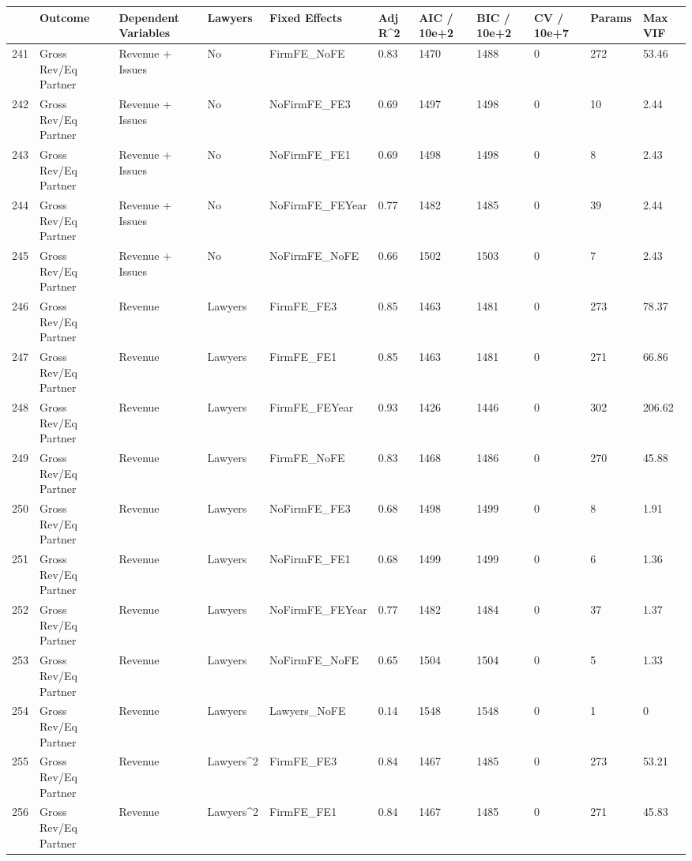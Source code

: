\documentclass{article}
\begin{document}
\begin{table}[H]
\centering
\begin{tabular}{rllllllllll}
  \hline
 & Outcome & Dependent Variables & Lawyers & Fixed Effects & Adj R^2 & AIC / 10e+2 & BIC / 10e+2 & CV / 10e+7 & Params & Max VIF \\ 
  \hline
241 & Gross Rev/Eq Partner & Revenue + Issues & No & FirmFE\_NoFE & 0.83 & 1470 & 1488 & 0 & 272 & 53.46 \\ 
  242 & Gross Rev/Eq Partner & Revenue + Issues & No & NoFirmFE\_FE3 & 0.69 & 1497 & 1498 & 0 & 10 & 2.44 \\ 
  243 & Gross Rev/Eq Partner & Revenue + Issues & No & NoFirmFE\_FE1 & 0.69 & 1498 & 1498 & 0 & 8 & 2.43 \\ 
  244 & Gross Rev/Eq Partner & Revenue + Issues & No & NoFirmFE\_FEYear & 0.77 & 1482 & 1485 & 0 & 39 & 2.44 \\ 
  245 & Gross Rev/Eq Partner & Revenue + Issues & No & NoFirmFE\_NoFE & 0.66 & 1502 & 1503 & 0 & 7 & 2.43 \\ 
  246 & Gross Rev/Eq Partner & Revenue & Lawyers & FirmFE\_FE3 & 0.85 & 1463 & 1481 & 0 & 273 & 78.37 \\ 
  247 & Gross Rev/Eq Partner & Revenue & Lawyers & FirmFE\_FE1 & 0.85 & 1463 & 1481 & 0 & 271 & 66.86 \\ 
  248 & Gross Rev/Eq Partner & Revenue & Lawyers & FirmFE\_FEYear & 0.93 & 1426 & 1446 & 0 & 302 & 206.62 \\ 
  249 & Gross Rev/Eq Partner & Revenue & Lawyers & FirmFE\_NoFE & 0.83 & 1468 & 1486 & 0 & 270 & 45.88 \\ 
  250 & Gross Rev/Eq Partner & Revenue & Lawyers & NoFirmFE\_FE3 & 0.68 & 1498 & 1499 & 0 & 8 & 1.91 \\ 
  251 & Gross Rev/Eq Partner & Revenue & Lawyers & NoFirmFE\_FE1 & 0.68 & 1499 & 1499 & 0 & 6 & 1.36 \\ 
  252 & Gross Rev/Eq Partner & Revenue & Lawyers & NoFirmFE\_FEYear & 0.77 & 1482 & 1484 & 0 & 37 & 1.37 \\ 
  253 & Gross Rev/Eq Partner & Revenue & Lawyers & NoFirmFE\_NoFE & 0.65 & 1504 & 1504 & 0 & 5 & 1.33 \\ 
  254 & Gross Rev/Eq Partner & Revenue & Lawyers & Lawyers\_NoFE & 0.14 & 1548 & 1548 & 0 & 1 & 0 \\ 
  255 & Gross Rev/Eq Partner & Revenue & Lawyers^2 & FirmFE\_FE3 & 0.84 & 1467 & 1485 & 0 & 273 & 53.21 \\ 
  256 & Gross Rev/Eq Partner & Revenue & Lawyers^2 & FirmFE\_FE1 & 0.84 & 1467 & 1485 & 0 & 271 & 45.83 \\ 

\end{tabular}
\end{table}
\end{document}
